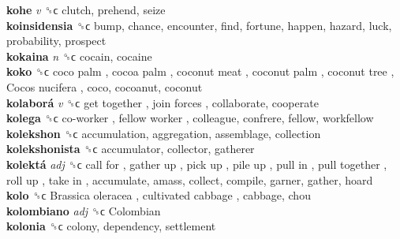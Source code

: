 \textbf{kohe} \emph{v}  ␝ϲ  clutch, prehend, seize  \\
\textbf{koinsidensia} ␝ϲ  bump, chance, encounter, find, fortune, happen, hazard, luck, probability, prospect  \\
\textbf{kokaina} \emph{n}  ␝ϲ  cocain, cocaine  \\
\textbf{koko} ␝ϲ   coco palm ,  cocoa palm ,  coconut meat ,  coconut palm ,  coconut tree ,  Cocos nucifera , coco, cocoanut, coconut  \\
\textbf{kolaborá} \emph{v}  ␝ϲ   get together ,  join forces , collaborate, cooperate  \\
\textbf{kolega} ␝ϲ   co-worker ,  fellow worker , colleague, confrere, fellow, workfellow  \\
\textbf{kolekshon} ␝ϲ  accumulation, aggregation, assemblage, collection  \\
\textbf{kolekshonista} ␝ϲ  accumulator, collector, gatherer  \\
\textbf{kolektá} \emph{adj}  ␝ϲ   call for ,  gather up ,  pick up ,  pile up ,  pull in ,  pull together ,  roll up ,  take in , accumulate, amass, collect, compile, garner, gather, hoard  \\
\textbf{kolo} ␝ϲ   Brassica oleracea ,  cultivated cabbage , cabbage, chou  \\
\textbf{kolombiano} \emph{adj}  ␝ϲ   Colombian   \\
\textbf{kolonia} ␝ϲ  colony, dependency, settlement  \\
